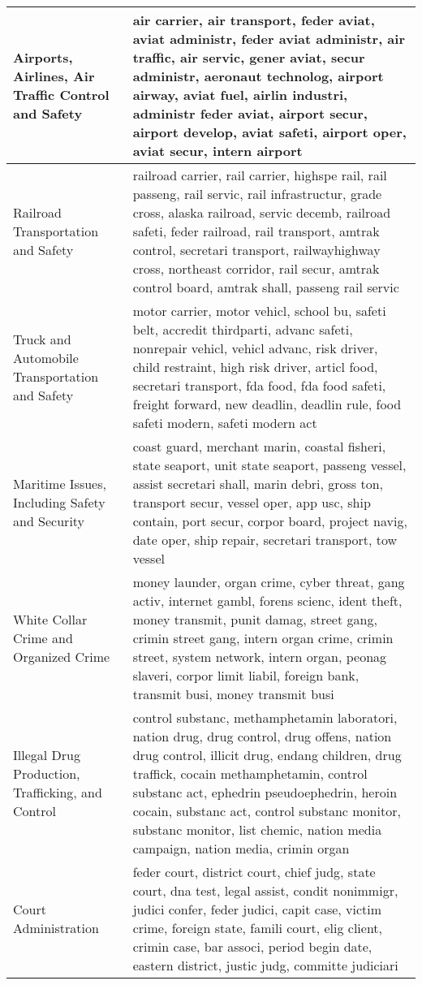 \begin{longtable}{p{}p{}}
   \hline
Airports, Airlines, Air Traffic Control and Safety & air carrier, air transport, feder aviat, aviat administr, feder aviat administr, air traffic, air servic, gener aviat, secur administr, aeronaut technolog, airport airway, aviat fuel, airlin industri, administr feder aviat, airport secur, airport develop, aviat safeti, airport oper, aviat secur, intern airport \\ 
   \hline
Railroad Transportation and Safety & railroad carrier, rail carrier, highspe rail, rail passeng, rail servic, rail infrastructur, grade cross, alaska railroad, servic decemb, railroad safeti, feder railroad, rail transport, amtrak control, secretari transport, railwayhighway cross, northeast corridor, rail secur, amtrak control board, amtrak shall, passeng rail servic \\ 
   \hline
Truck and Automobile Transportation and Safety & motor carrier, motor vehicl, school bu, safeti belt, accredit thirdparti, advanc safeti, nonrepair vehicl, vehicl advanc, risk driver, child restraint, high risk driver, articl food, secretari transport, fda food, fda food safeti, freight forward, new deadlin, deadlin rule, food safeti modern, safeti modern act \\ 
   \hline
Maritime Issues, Including Safety and Security & coast guard, merchant marin, coastal fisheri, state seaport, unit state seaport, passeng vessel, assist secretari shall, marin debri, gross ton, transport secur, vessel oper, app usc, ship contain, port secur, corpor board, project navig, date oper, ship repair, secretari transport, tow vessel \\ 
   \hline
White Collar Crime and Organized Crime & money launder, organ crime, cyber threat, gang activ, internet gambl, forens scienc, ident theft, money transmit, punit damag, street gang, crimin street gang, intern organ crime, crimin street, system network, intern organ, peonag slaveri, corpor limit liabil, foreign bank, transmit busi, money transmit busi \\ 
   \hline
Illegal Drug Production, Trafficking, and Control & control substanc, methamphetamin laboratori, nation drug, drug control, drug offens, nation drug control, illicit drug, endang children, drug traffick, cocain methamphetamin, control substanc act, ephedrin pseudoephedrin, heroin cocain, substanc act, control substanc monitor, substanc monitor, list chemic, nation media campaign, nation media, crimin organ \\ 
   \hline
Court Administration & feder court, district court, chief judg, state court, dna test, legal assist, condit nonimmigr, judici confer, feder judici, capit case, victim crime, foreign state, famili court, elig client, crimin case, bar associ, period begin date, eastern district, justic judg, committe judiciari \\ 

\end{longtable}
